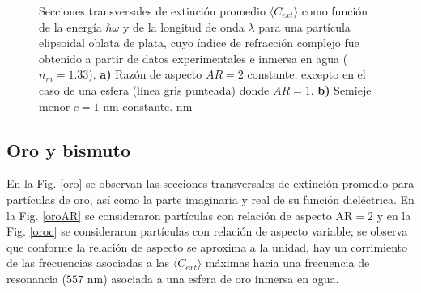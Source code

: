 \begin{figure}[h!]
	\quad%
	\caption{Secciones transversales de extinción promedio $\langle C_{ext}\rangle$ como función de la energía $\hbar\omega$ y de la longitud de onda $\lambda$ para una partícula elipsoidal oblata de plata, cuyo índice de refracción complejo fue obtenido a partir de datos experimentales  e inmersa en agua ($n_m=1.33$). \textbf{a)} Razón de aspecto $AR=2$ constante, excepto en el caso de una esfera (línea gris punteada) donde $AR=1$. \textbf{b)} Semieje menor $c=1$ nm constante. nm}\label{plata}
\end{figure}

\subsection*{Oro y bismuto}
En la Fig. \ref{oro} se observan las secciones transversales de extinción promedio para partículas de oro, así como la parte imaginaria y real de su función dieléctrica. En la Fig. \ref{oroAR} se consideraron partículas con relación de aspecto AR$=2$ y en la Fig. \ref{oroc} se consideraron partículas con relación de aspecto variable; se observa que conforme la relación de aspecto se aproxima a la unidad, hay un corrimiento de las frecuencias asociadas a las $\langle C_{ext}\rangle$ máximas hacia una frecuencia de resonancia ($557\text{ nm}$) asociada a una esfera de oro inmersa en agua. 


